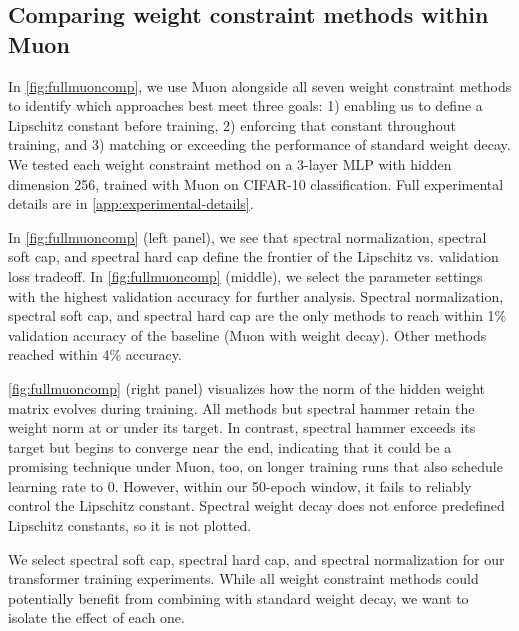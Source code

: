 \subsection{Comparing weight constraint methods within Muon} 

In \cref{fig:fullmuoncomp}, we use Muon alongside all seven weight constraint methods to identify which approaches best meet three goals: 1) enabling us to define a Lipschitz constant before training, 2) enforcing that constant throughout training, and 3) matching or exceeding the performance of standard weight decay. We tested each weight constraint method on a 3-layer MLP with hidden dimension 256, trained with Muon on CIFAR-10 classification. Full experimental details are in \cref{app:experimental-details}.

In \cref{fig:fullmuoncomp} (left panel), we see that spectral normalization, spectral soft cap, and spectral hard cap define the frontier of the Lipschitz vs. validation loss tradeoff. In \cref{fig:fullmuoncomp} (middle), we select the parameter settings with the highest validation accuracy for further analysis. Spectral normalization, spectral soft cap, and spectral hard cap are the only methods to reach within 1\% validation accuracy of the baseline (Muon with weight decay). Other methods reached within 4\% accuracy.

\cref{fig:fullmuoncomp} (right panel) visualizes how the norm of the hidden weight matrix evolves during training. All methods but spectral hammer retain the weight norm at or under its target. In contrast, spectral hammer exceeds its target but begins to converge near the end, indicating that it could be a promising technique under Muon, too, on longer training runs that also schedule learning rate to 0. However, within our 50-epoch window, it fails to reliably control the Lipschitz constant. Spectral weight decay does not enforce predefined Lipschitz constants, so it is not plotted.

We select spectral soft cap, spectral hard cap, and spectral normalization for our transformer training experiments. While all weight constraint methods could potentially benefit from combining with standard weight decay, we want to isolate the effect of each one.

